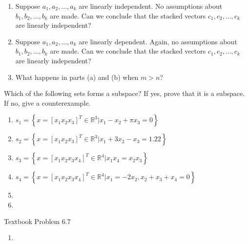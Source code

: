 \documentclass{homework}
\begin{document}
\begin{enumerate}[label=(\alph*)]
	\item Suppose $a_1, a_2, \ldots, a_k$ are linearly independent. No
	      assumptions about $b_1, b_2, \ldots, b_k$ are made. Can we conclude that
	      the stacked vectors
	      $c_1, c_2, \ldots, c_k$ are linearly independent?
	\item Suppose $a_1, a_2, \ldots, a_k$ are linearly dependent. Again, no
	      assumptions about $b_1, b_2, \ldots, b_k$ are made. Can we conclude that
	      the stacked vectors
	      $c_1, c_2, \ldots, c_k$ are linearly independent?
	\item What happens in parts (a) and (b) when $m > n$?
\end{enumerate}
\question
Which of the following sets forms a subspace? If yes, prove that it is a
subspace. If no, give a counterexample.
\begin{enumerate}[label=(\alph*)]
	\item
	      $s_{1} =
		      \left\{
		      x=\left[x_{1}x_{2}x_{3}\right]^T \in \mathbb{R}^3 | x_1 - x_2 +
		      \pi x_3 = 0
		      \right\}$
	\item
	      $s_{2} =
		      \left\{
		      x=\left[x_{1}x_{2}x_{3}\right]^T \in \mathbb{R}^3 | x_1 + 3x_2 -
		      x_3 = 1.22
		      \right\}$
	\item
	      $s_{3} =
		      \left\{
		      x=\left[x_{1}x_{2}x_{3}x_{4}\right]^T \in \mathbb{R}^4 | x_1x_4 =
		      x_2x_3 \right\}$
	\item
	      $s_{4} =
		      \left\{
		      x=\left[x_{1}x_{2}x_{3}x_{4}\right]^T \in \mathbb{R}^4 | x_1 =
		      -2x_2, x_2 + x_3 + x_4 = 0 \right\}$
	\item
	\item
\end{enumerate}
\question

Textbook Problem 6.7
\begin{enumerate}[label=(\alph*)]
	\item
\end{enumerate}
\end{document}
